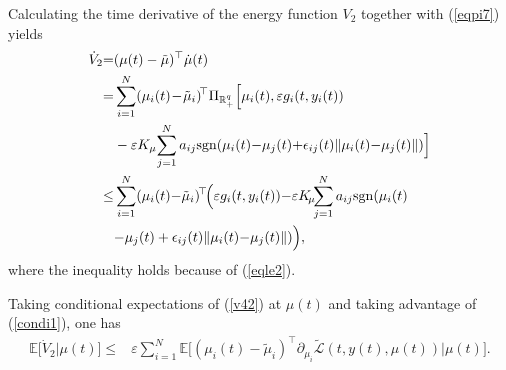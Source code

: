 \documentclass[final,5p,times,twocolumn,authoryear]{elsarticle}
\newcommand{\sign}[1]{\mathrm{sgn}(#1)}
\begin{document}

	Calculating the time derivative of the energy function $V_2$ together with (\ref{eqpi7}) yields	
	\begin{align}
		\dot{V}_{2}
		{=} 
		&(\mu(t)-\tilde{\mu})^\top \dot{\mu}(t)\notag\\
		=
		&\sum_{i=1}^{N} (\mu_i(t)\!-\!\tilde{\mu}_i)\!^{\top} \Pi_{\mathbb{R}_+^q}\Big[\mu_i(t),\varepsilon g_i(t,y_i(t))\notag\\
		&-\varepsilon K_\mu \!\sum_{j=1}^N a_{ij} \sign{\mu_i(t){-}\mu_j(t){+}\epsilon_{ij}(t)\|\mu_i(t){-}\mu_j(t)\|}\Big] \notag\\
		\le
		& \sum_{i=1}^{N} (\mu_i(t){-}\tilde{\mu}_i)^{\!\top}\! \Big(\varepsilon g_i(t,y_i(t)){-}\varepsilon K_{\!\mu}\!\! \sum_{j=1}^N a_{ij} \sign{\mu_i(t)\notag\\
			&{-}\mu_j(t) + \epsilon_{ij}(t)\|\mu_i(t){-}\mu_j(t)\|}\Big),\label{v42}
	\end{align}
	where the inequality  holds because of  (\ref{eqle2}).
	
	Taking conditional expectations of (\ref{v42}) at $\mu(t)$ and taking advantage of (\ref{condi1}), one has
	\begin{align}
		\mathbb{E}\big[\dot{V}_{2}\big|\mu(t)\big]
		\le	
		&\varepsilon\sum_{i=1}^{N} \mathbb{E}\Big[(\mu_i(t)-\tilde{\mu}_i)^\top 
		 \partial_{\mu_i}\mathcal{\tilde{L}}(t,y(t),\mu(t))\Big|\mu(t)\Big].\label{v43}	
	\end{align}
	
\end{document}

